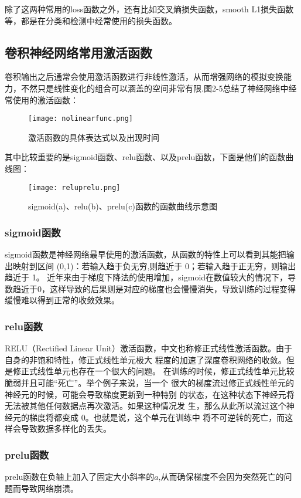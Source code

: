 除了这两种常用的loss函数之外，还有比如交叉熵损失函数，smooth L1\cite{FASTERRCNN}损失函数等，都是在分类和检测中经常使用的损失函数。

\subsection{卷积神经网络常用激活函数}
卷积输出之后通常会使用激活函数进行非线性激活，从而增强网络的模拟变换能力，不然只是线性变化的组合可以涵盖的空间非常有限.图2-5总结了神经网络中经常使用的激活函数：
\begin{figure}[!ht]
 \centering
	\texttt{[image: nolinearfunc.png]}
	\caption{激活函数的具体表达式以及出现时间}
\end{figure}

其中比较重要的是sigmoid函数、relu函数、以及prelu函数，下面是他们的函数曲线图：
\begin{figure}[!ht]
 \centering
	\texttt{[image: reluprelu.png]}
	\caption{sigmoid(a)、relu(b)、prelu(c)函数的函数曲线示意图}
\end{figure}

\subsubsection{sigmoid函数}
sigmoid函数是神经网络最早使用的激活函数，从函数的特性上可以看到其能把输出映射到区间 (0,1)：若输入趋于负无穷,则趋近于 0；若输入趋于正无穷，则输出趋近于 1。
近年来由于梯度下降法的使用增加，sigmoid在数值较大的情况下，导数趋近于0，这样导致的后果则是对应的梯度也会慢慢消失，导致训练的过程变得缓慢难以得到正常的收敛效果。
\subsubsection{relu函数}
RELU（Rectified Linear Unit）激活函数，中文也称修正式线性激活函数。由于自身的非饱和特性，修正式线性单元极大 程度的加速了深度卷积网络的收敛。但是修正式线性单元也存在一个很大的问题。 在训练的时候，修正式线性单元比较脆弱并且可能“死亡”。举个例子来说，当一个 很大的梯度流过修正式线性单元的神经元的时候，可能会导致梯度更新到一种特别 的状态，在这种状态下神经元将无法被其他任何数据点再次激活。如果这种情况发 生，那么从此所以流过这个神经元的梯度将都变成 0。也就是说，这个单元在训练中 将不可逆转的死亡，而这样会导致数据多样化的丢失。
\subsubsection{prelu函数}
prelu函数在负轴上加入了固定大小斜率的$a$,从而确保梯度不会因为突然死亡的问题而导致网络崩溃。

